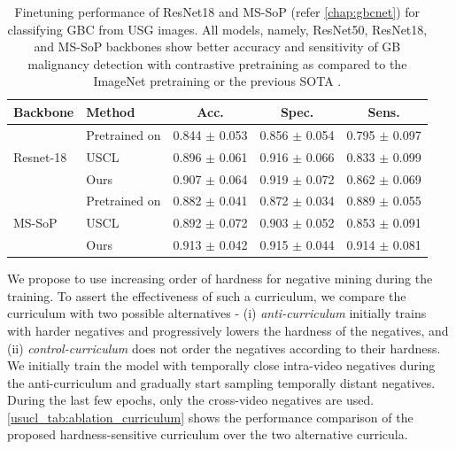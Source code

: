 \begin{table}[t]
    	\centering
        \footnotesize
    	\setlength{\tabcolsep}{10pt}
    	\begin{tabular}{llccc}
    		\toprule
    		\textbf{Backbone} & \textbf{Method}	& \textbf{Acc.} & \textbf{Spec.} & \textbf{Sens.} \\
    		\midrule
    		\multirow{3}{*}{Resnet-18} & Pretrained on \cite{imagenet} &  0.844 $\pm$ 0.053 & 0.856 $\pm$ 0.054 & 0.795 $\pm$ 0.097 \\
    		& USCL \cite{uscl} & 0.896 $\pm$ 0.061 & 0.916 $\pm$ 0.066 & 0.833 $\pm$ 0.099 \\
    		\cmidrule{2-5}%
    		& Ours & 0.907 $\pm$ 0.064 & 0.919 $\pm$ 0.072 & 0.862 $\pm$ 0.069 \\
            \midrule
            \multirow{3}{*}{MS-SoP} & Pretrained on \cite{imagenet} &   0.882 $\pm$ 0.041 & 0.872 $\pm$ 0.034 & 0.889 $\pm$ 0.055 \\
    		& USCL \cite{uscl} & 0.892 $\pm$ 0.072 & 0.903 $\pm$ 0.052 & 0.853 $\pm$ 0.091 \\
    		\cmidrule{2-5}%
    		& Ours & 0.913 $\pm$ 0.042 & 0.915 $\pm$ 0.044 & 0.914 $\pm$ 0.081 \\
    		\bottomrule
    	\end{tabular}
        \caption[Performance of different backbones with our contrastive framework]{Finetuning performance of ResNet18 and MS-SoP (refer \cref{chap:gbcnet}) for classifying GBC from USG images. All models, namely, ResNet50, ResNet18, and MS-SoP backbones show better accuracy and sensitivity of GB malignancy detection with contrastive pretraining as compared to the ImageNet pretraining or the previous SOTA \cite{uscl}.}
    	\label{usucl_tab:res18_gbc_results}
\end{table}

%
We propose to use increasing order of hardness for negative mining during the training. To assert the effectiveness of such a curriculum, we compare the curriculum with two possible alternatives - (i) \emph{anti-curriculum} initially trains with harder negatives and progressively lowers the hardness of the negatives, and (ii) \emph{control-curriculum}  does not order the negatives according to their hardness. We initially train the model with temporally close intra-video negatives during the anti-curriculum and gradually start sampling temporally distant negatives. During the last few epochs, only the cross-video negatives are used. \cref{usucl_tab:ablation_curriculum} shows the performance comparison of the proposed hardness-sensitive curriculum over the two alternative curricula.

